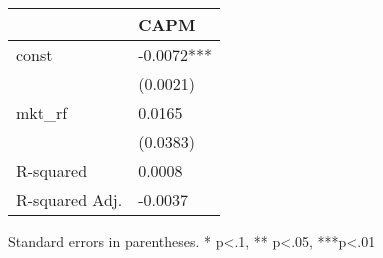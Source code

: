 \begin{table}
\caption{}
\label{}
\begin{center}
\begin{tabular}{ll}
\hline
               & CAPM        \\
\hline
const          & -0.0072***  \\
               & (0.0021)    \\
mkt\_rf        & 0.0165      \\
               & (0.0383)    \\
R-squared      & 0.0008      \\
R-squared Adj. & -0.0037     \\
\hline
\end{tabular}
\end{center}
\end{table}
\bigskip
Standard errors in parentheses. \newline 
* p<.1, ** p<.05, ***p<.01